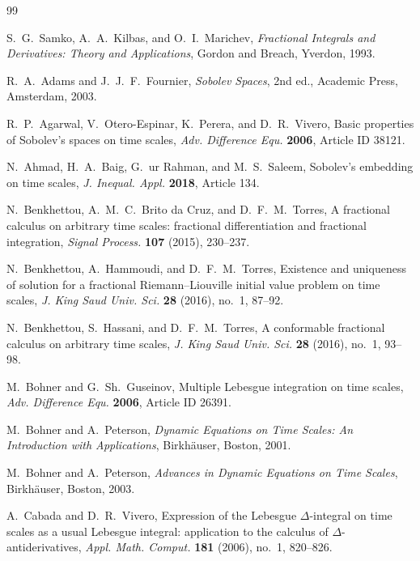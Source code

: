 \documentclass[11pt,a4paper]{article}
\numberwithin{equation}{section}
\theoremstyle{definition}
\begin{document}
\begin{thebibliography}{99}

S.~G.~Samko, A.~A.~Kilbas, and O.~I.~Marichev,
\emph{Fractional Integrals and Derivatives: Theory and Applications},
Gordon and Breach, Yverdon, 1993.

R.~A.~Adams and J.~J.~F.~Fournier,
\emph{Sobolev Spaces},
2nd ed., Academic Press, Amsterdam, 2003.

R.~P.~Agarwal, V.~Otero-Espinar, K.~Perera, and D.~R.~Vivero,
Basic properties of Sobolev's spaces on time scales,
\emph{Adv. Difference Equ.} \textbf{2006}, Article ID 38121.

N.~Ahmad, H.~A.~Baig, G.~ur Rahman, and M.~S.~Saleem,
Sobolev's embedding on time scales,
\emph{J. Inequal. Appl.} \textbf{2018}, Article 134.

N.~Benkhettou, A.~M.~C.~Brito da Cruz, and D.~F.~M.~Torres,
A fractional calculus on arbitrary time scales: fractional differentiation and fractional integration,
\emph{Signal Process.} \textbf{107} (2015), 230--237.

N.~Benkhettou, A.~Hammoudi, and D.~F.~M.~Torres,
Existence and uniqueness of solution for a fractional Riemann--Liouville initial value problem on time scales,
\emph{J. King Saud Univ. Sci.} \textbf{28} (2016), no.~1, 87--92.

N.~Benkhettou, S.~Hassani, and D.~F.~M.~Torres,
A conformable fractional calculus on arbitrary time scales,
\emph{J. King Saud Univ. Sci.} \textbf{28} (2016), no.~1, 93--98.

M.~Bohner and G.~Sh.~Guseinov,
Multiple Lebesgue integration on time scales,
\emph{Adv. Difference Equ.} \textbf{2006}, Article ID 26391.

M.~Bohner and A.~Peterson,
\emph{Dynamic Equations on Time Scales: An Introduction with Applications},
Birkh\"auser, Boston, 2001.

M.~Bohner and A.~Peterson,
\emph{Advances in Dynamic Equations on Time Scales},
Birkh\"auser, Boston, 2003.

A.~Cabada and D.~R.~Vivero,
Expression of the Lebesgue $\Delta$-integral on time scales as a usual Lebesgue integral: application to the calculus of $\Delta$-antiderivatives,
\emph{Appl. Math. Comput.} \textbf{181} (2006), no.~1, 820--826.


\end{thebibliography}
\end{document}
